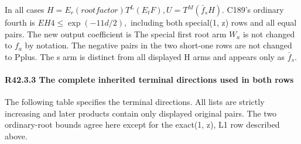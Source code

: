 In all cases \(H=E_r(rootfactor)T^L(E_tF),\allowbreak  U=T^M(\bar f_sH).\)
C189's ordinary fourth is \(EH4\le \exp(-11d/2),\allowbreak \) including both
special(1, z) rows and all equal pairs. The new output coefficient is
The special first root arm \(W_a\) is not changed to \(f_a\) by notation.
The negative pairs in the two short-one rows are not changed to Pplus.
The s arm is distinct from all displayed H arms and appears only as \(\bar f_s.\)

\paragraph{R42.3.3 The complete inherited terminal directions used in both rows}

The following table specifies the terminal directions. All
lists are strictly increasing and later products contain only displayed
original pairs. The two ordinary-root bounds agree here except for the
exact(1, z), L1 row described above.


